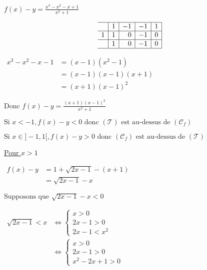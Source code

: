 \documentclass[12pt,a4paper]{article}
\begin{document}
\begin{enumerate}
          \(
          f(x) - y = \frac{x^3 - x^2 - x + 1}{x^2 + 1}
          \)


          \[
              \begin{array}{r|r|r|r|r|}
                  \hline
                    & 1 & -1 & -1 & 1 \\
                  \hline
                  1 & 1 & 0  & -1 & 0 \\
                  \hline
                    & 1 & 0  & -1 & 0 \\
                  \hline
              \end{array}
          \]


          \(
          \begin{aligned}
              x^3 - x^2 - x - 1 & = (x - 1)(x^2 - 1)      \\
                                & = (x - 1)(x - 1)(x + 1) \\
                                & = (x + 1)(x - 1)^{2}
          \end{aligned}
          \)

          \(
          \text{Donc } f(x) - y = \frac{(x + 1)(x - 1)^{2}}{x^2 + 1}
          \)

          \(
          \text{Si } x < -1, f(x) - y < 0 \text{ donc } (\mathcal{T}) \text{ est au-dessus de } (\mathcal{C}_f)
          \)

          \(
          \text{Si } x \in ]-1, 1[, f(x) - y > 0 \text{ donc } (\mathcal{C}_f) \text{ est au-dessus de } (\mathcal{T})
          \)

          \underline{Pour \( x > 1 \)}

          \(
          \begin{aligned}
              f(x) - y & = 1 + \sqrt{2x - 1} - (x + 1) \\
                       & = \sqrt{2x - 1} - x
          \end{aligned}
          \)

          \(
          \text{Supposons que } \sqrt{2x - 1} - x < 0
          \)

          \(
          \begin{aligned}
              \sqrt{2x - 1} < x
               & \Leftrightarrow
              \begin{cases}
                  x > 0      \\
                  2x - 1 > 0 \\
                  2x - 1 < x^2
              \end{cases}       \\
               & \Leftrightarrow
              \begin{cases}
                  x > 0      \\
                  2x - 1 > 0 \\
                  x^2 - 2x + 1>0
              \end{cases}
          \end{aligned}
          \)


\end{enumerate}
\end{document}
